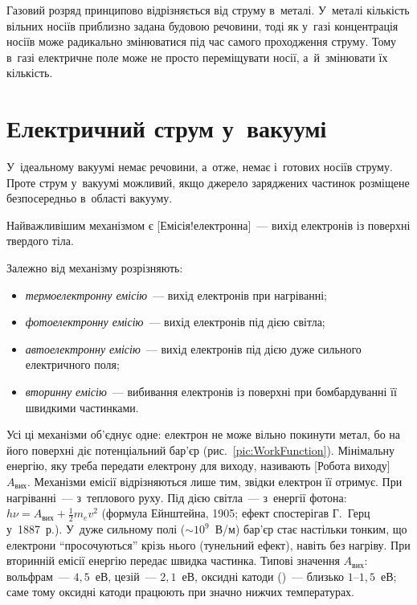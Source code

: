 \begin{Attention}
	Газовий розряд принципово відрізняється від струму в~металі. У~металі кількість
	вільних носіїв приблизно задана будовою речовини, тоді як у~газі концентрація носіїв
	може радикально змінюватися під час самого проходження струму. Тому в~газі електричне
	поле може не просто переміщувати носії, а~й~змінювати їх кількість.
\end{Attention}


\section{Електричний струм у~вакуумі}\label{sec:CurrentInVacuum}\hypertarget{current-in-vacuum}{}


У~ідеальному вакуумі немає речовини, а~отже, немає і~готових носіїв струму. Проте струм
у~вакуумі можливий, якщо джерело заряджених частинок розміщене безпосередньо в~області
вакууму.

Найважливішим механізмом є [Емісія!електронна]~--- вихід електронів із поверхні
твердого тіла.

Залежно від механізму розрізняють:
\begin{itemize}
	\item \emph{термоелектронну емісію}~--- вихід електронів при нагріванні;
	\item \emph{фотоелектронну емісію}~--- вихід електронів під дією світла;
	\item \emph{автоелектронну емісію}~--- вихід електронів під дією дуже сильного
	  електричного поля;
	\item \emph{вторинну емісію}~--- вибивання електронів із поверхні при бомбардуванні
	  її швидкими частинками.
\end{itemize}

Усі ці механізми об'єднує одне: електрон не може вільно покинути метал, бо на його
поверхні діє потенціальний бар'єр (рис.~\ref{pic:WorkFunction}). Мінімальну енергію, яку
треба передати електрону для виходу, називають [Робота виходу] $A_{\text{вих}}$.
Механізми емісії відрізняються лише тим, звідки електрон її отримує. При нагріванні~---
з~теплового руху. Під дією світла~--- з~енергії фотона:
$h\nu=A_{\text{вих}}+\tfrac12m_ev^2$ (формула Ейнштейна, 1905; ефект спостерігав Г.~Герц
у~1887~р.). У~дуже сильному полі ($\sim10^9$~В/м) бар'єр стає настільки тонким, що
електрони \enquote{просочуються} крізь нього (тунельний ефект), навіть без нагріву. При
вторинній емісії енергію передає швидка частинка. Типові значення $A_{\text{вих}}$:
вольфрам~--- $4{,}5$~еВ, цезій~--- $2{,}1$~еВ, оксидні катоди ()~--- близько
$1$--$1{,}5$~еВ; саме тому оксидні катоди працюють при значно нижчих температурах.

